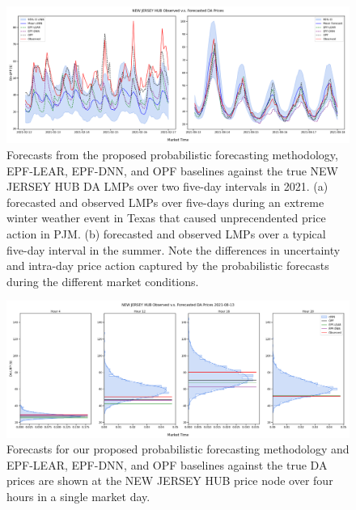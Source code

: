 \begin{figure}[htbp]
    \caption[Timeseries of observed v.s. forecast prices]{
        Forecasts from the proposed probabilistic forecasting methodology, EPF-LEAR, EPF-DNN, and OPF baselines
        against the true NEW JERSEY HUB DA LMPs over two five-day intervals in 2021.
        (a) forecasted and observed LMPs over five-days during an extreme winter weather event in Texas
        that caused unprecendented price action in PJM.
        (b) forecasted and observed LMPs over a typical five-day interval in the summer.
        Note the differences in uncertainty and intra-day price action captured by the probabilistic forecasts
        during the different market conditions.
    }
    \begin{center}
        \setlength{\fboxsep}{0pt}%
        \setlength{\fboxrule}{1pt}%
        \includegraphics[width=150mm]{figs/nj_hub_ts}
    \end{center}
    \label{fig:forecast_timeseries}
\end{figure}

\begin{figure}[htbp]
    \caption[Comparison of forecasts at select market-hours]{
        Forecasts for our proposed probabilistic forecasting methodology and EPF-LEAR, EPF-DNN, and OPF baselines
        against the true DA prices are shown at the NEW JERSEY HUB price node over four hours in a single market day.
    }
    \begin{center}
        \setlength{\fboxsep}{0pt}%
        \setlength{\fboxrule}{1pt}%
        \includegraphics[width=150mm]{figs/nj_hub_densities}
    \end{center}
    \label{fig:univar_dens}
\end{figure}
